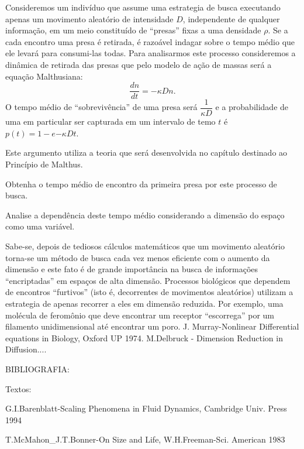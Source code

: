     Consideremos um indivíduo que assume uma estrategia de busca executando apenas um movimento aleatório de intensidade \(D\), independente de qualquer informação, em um meio constituído de ``presas'' fixas a uma densidade \(\rho\). Se a cada encontro uma presa é retirada, é razoável indagar sobre o tempo médio que ele levará para consumi-las todas. Para analisarmos este processo consideremos a dinâmica de retirada das presas que pelo modelo de ação de massas será a equação Malthusiana:
    \[\dfrac{dn}{dt} = -\kappa Dn.\]
    O tempo médio de ``sobrevivência'' de uma presa será \(\dfrac{1}{\kappa D}\) e a probabilidade de uma em particular ser capturada em um intervalo de temo \(t\) é \(p(t) = 1 - e{-\kappa Dt}\).

    Este argumento utiliza a teoria que será desenvolvida no capítulo destinado ao Princípio de Malthus.


\begin{exercise}
    Obtenha o tempo médio de encontro da primeira presa por este processo de busca.
    \end{exercise}

    \begin{exercise}
    Analise a dependência deste tempo médio considerando a dimensão do espaço como uma variável.
    \end{exercise}

    Sabe-se, depois de tediosos cálculos matemáticos que um movimento aleatório torna-se um método de busca cada vez menos eficiente com o aumento da dimensão e este fato é de grande importância na busca de informações ``encriptadas'' em espaços de alta dimensão. Processos biológicos que dependem de encontros ``furtivos'' (isto é, decorrentes de movimentos aleatórios) utilizam a estrategia de apenas recorrer a eles em dimensão reduzida. Por exemplo, uma molécula de feromônio que deve encontrar um receptor ``escorrega'' por um filamento unidimensional até encontrar um poro. J. Murray-Nonlinear Differential equations in Biology, Oxford UP 1974. M.Delbruck - Dimension Reduction in Diffusion....





BIBLIOGRAFIA:

Textos:

G.I.Barenblatt-Scaling Phenomena in Fluid Dynamics, Cambridge Univ. Press 1994

T.McMahon\_J.T.Bonner-On Size and Life, W.H.Freeman-Sci. American 1983

